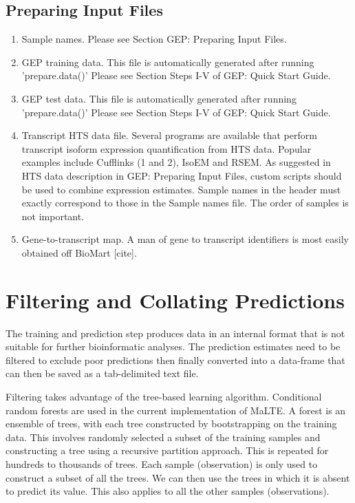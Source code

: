 \documentclass[a4paper,12pt]{article}
\begin{document}
\subsection{Preparing Input Files}
\label{tiep:prepare}
\begin{enumerate}
\item Sample names. Please see Section GEP: Preparing Input Files.

\item GEP training data. This file is automatically generated after running 'prepare.data()' Please see Section Steps I-V of GEP: Quick Start Guide.

\item GEP test data. This file is automatically generated after running 'prepare.data()' Please see Section Steps I-V of GEP: Quick Start Guide.

\item Transcript HTS data file. Several programs are available that perform transcript isoform expression quantification from HTS data. Popular examples include Cufflinks (1 and 2), IsoEM and RSEM. As suggested in HTS data description in GEP: Preparing Input Files, custom scripts should be used to combine expression estimates. Sample names in the header must exactly correspond to those in the Sample names file. The order of samples is not important.

\item Gene-to-transcript map. A man of gene to transcript identifiers is most easily obtained off BioMart [cite].
\end{enumerate}

\section{Filtering and Collating Predictions}
The training and prediction step produces data in an internal format that is not suitable for further bioinformatic analyses. The prediction estimates need to be filtered to exclude poor predictions then finally converted into a data-frame that can then be saved as a tab-delimited text file.

Filtering takes advantage of the tree-based learning algorithm. Conditional random forests are used in the current implementation of MaLTE. A forest is an ensemble of trees, with each tree constructed by bootstrapping on the training data. This involves randomly selected a subset of the training samples and constructing a tree using a recursive partition approach. This is repeated for hundreds to thousands of trees. Each sample (observation) is only used to construct a subset of all the trees. We can then use the trees in which it is absent to predict its value. This also applies to all the other samples (observations).
\end{document}
